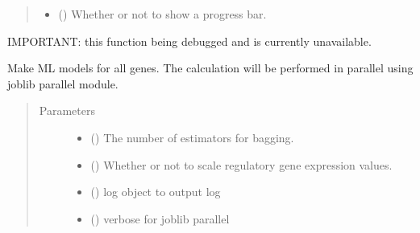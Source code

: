 \documentclass[letterpaper,10pt,english]{sphinxmanual}
\begin{document}
\begin{fulllineitems}
\begin{fulllineitems}
\begin{quote}
\begin{description}
\begin{itemize}
\item {} 
 () \textendash{} Whether or not to show a progress bar.

\end{itemize}

\end{description}\end{quote}

\end{fulllineitems}


\begin{fulllineitems}
\label{\detokenize{modules/celloracle:celloracle.Net.fit_All_genes_parallel}}
IMPORTANT: this function being debugged and is currently unavailable.

Make ML models for all genes.
The calculation will be performed in parallel using joblib parallel module.
\begin{quote}\begin{description}
\item[{Parameters}] \leavevmode\begin{itemize}
\item {} 
 () \textendash{} The number of estimators for bagging.

\item {} 
 () \textendash{} Whether or not to scale regulatory gene expression values.

\item {} 
 () \textendash{} log object to output log

\item {} 
 () \textendash{} verbose for joblib parallel


\end{itemize}
\end{description}
\end{quote}
\end{fulllineitems}
\end{fulllineitems}
\end{document}
